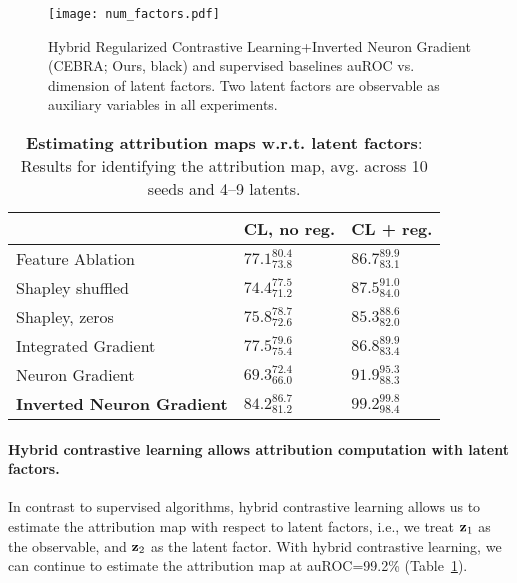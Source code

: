     \begin{figure}[t]
        \begin{center}
        \texttt{[image: num\_factors.pdf]}
        \end{center}
        \vspace{-1em}        
        \caption{Hybrid Regularized Contrastive Learning+Inverted Neuron Gradient (CEBRA; Ours, black) and supervised baselines auROC vs. dimension of latent factors. Two latent factors are observable as auxiliary variables in all experiments.
        }
        \label{fig:latent-factors}
    \end{figure}
    
\begin{table}[t]
    \caption{\textbf{Estimating attribution maps w.r.t. latent factors}: Results for identifying the attribution map, avg. across 10 seeds and 4--9 latents.}
    \label{table:latent-attribution}
    \small
    \begin{center}
    \addtolength{\tabcolsep}{-3pt}
    \vspace{-8pt}
    \begin{tabular}{lll}
    \toprule
     & CL, no reg. & \textbf{CL + reg.} \\
    \midrule
    Feature Ablation & $77.1_{73.8}^{80.4}$ & $86.7_{83.1}^{89.9}$ \\
    Shapley shuffled & $74.4_{71.2}^{77.5}$ & $87.5_{84.0}^{91.0}$ \\
    Shapley, zeros & $75.8_{72.6}^{78.7}$ & $85.3_{82.0}^{88.6}$ \\
    Integrated Gradient & $77.5_{75.4}^{79.6}$ & $86.8_{83.4}^{89.9}$ \\
    Neuron Gradient & $69.3_{66.0}^{72.4}$ & $91.9_{88.3}^{95.3}$ \\
    \midrule
    \textbf{Inverted Neuron Gradient} & $84.2_{81.2}^{86.7}$ & $\mathbf{99.2_{98.4}^{99.8}}$ \\
    \bottomrule
    \end{tabular}
    \end{center}
    \vspace{-5pt}
\end{table}

    \paragraph{Hybrid contrastive learning allows attribution computation with latent factors.}
        In contrast to supervised algorithms, hybrid contrastive learning allows us to estimate the attribution map with respect to latent factors, i.e., we treat $\mathbf{z}_1$ as the observable, and $\mathbf{z}_2$ as the latent factor. With hybrid contrastive learning, we can continue to estimate the attribution map at auROC=99.2\% (Table~\ref{table:latent-attribution}).

